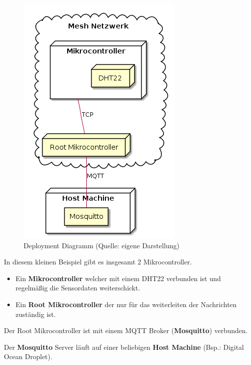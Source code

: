 \vspace*{50px}
\begin{figure}[H]
    \begin{center}
        \includegraphics[scale=.5]{diagrams/mqtt_dht22_example_deployment.png}
        \caption{Deployment Diagramm (Quelle: eigene Darstellung)}
    \end{center}    
\end{figure}

In diesem kleinen Beispiel gibt es insgesamt 2 Mikrocontroller. 

\begin{itemize}
    \item Ein \textbf{Mikrocontroller} welcher mit einem DHT22 verbunden ist und regelmäßig die Sensordaten weiterschickt.
    \item Ein \textbf{Root Mikrocontroller} der nur für das weiterleiten der Nachrichten zuständig ist.
\end{itemize}

Der Root Mikrocontroller ist mit einem MQTT Broker (\textbf{Mosquitto}) verbunden.

Der \textbf{Mosquitto} Server läuft auf einer beliebigen \textbf{Host Machine} (Bsp.: Digital Ocean Droplet).

